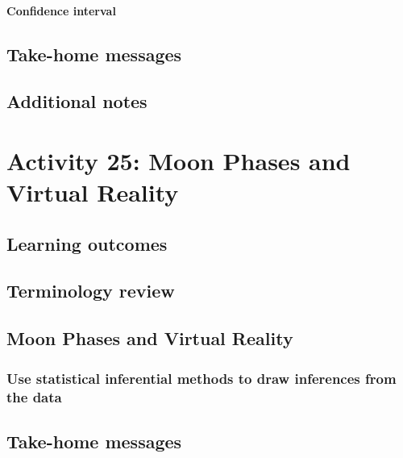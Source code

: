 \documentclass[
]{report}
\begin{document}
\paragraph*{Confidence interval}\label{confidence-interval-7}

\subsection{Take-home messages}\label{take-home-messages-22}

\subsection{Additional notes}\label{additional-notes-23}

\section{Activity 25: Moon Phases and Virtual Reality}\label{activity-25-moon-phases-and-virtual-reality}

\subsection{Learning outcomes}\label{learning-outcomes-28}

\subsection{Terminology review}\label{terminology-review-22}

\subsection{Moon Phases and Virtual Reality}\label{moon-phases-and-virtual-reality}

\subsubsection*{Use statistical inferential methods to draw inferences from the data}\label{use-statistical-inferential-methods-to-draw-inferences-from-the-data-6}

\subsection{Take-home messages}\label{take-home-messages-23}
\end{document}
